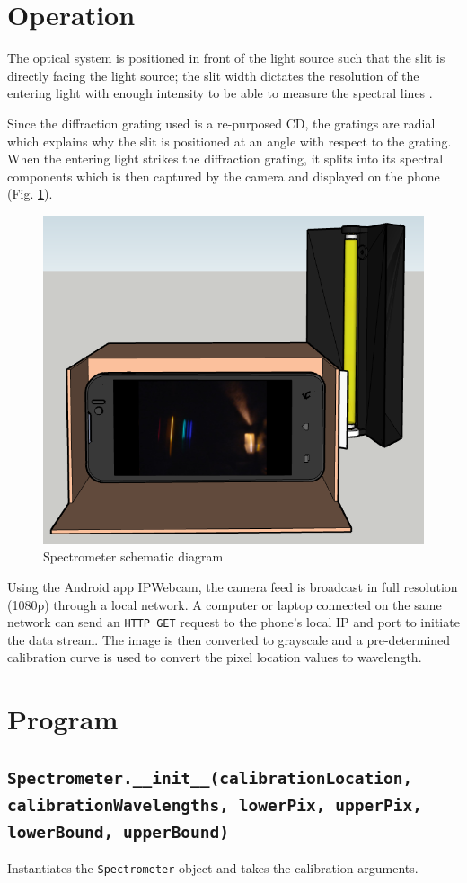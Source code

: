 \documentclass[12pt,a4paper,twoside]{article}
\begin{document}
\section{Operation}\label{sec:operation}\medskip
The optical system is positioned in front of the light source such that the slit is directly facing the light source; the slit width dictates the resolution of the entering light with enough intensity to be able to measure the spectral lines \cite{slit}. 

Since the diffraction grating used is a re-purposed CD, the gratings are radial which explains why the slit is positioned at an angle with respect to the grating. When the entering light strikes the diffraction grating, it splits into its spectral components which is then captured by the camera and displayed on the phone (Fig. \ref{setup}).

\begin{figure} [!h]
	\centering
	\includegraphics[width=0.6\linewidth]{setup1.PNG}
	\caption{\label{setup} Spectrometer schematic diagram}
\end{figure}

Using the Android app IPWebcam, the camera feed is broadcast in full resolution (1080p) through a local network. A computer or laptop connected on the same network can send an \texttt{HTTP GET} request to the phone's local IP and port to initiate the data stream. The image is then converted to grayscale and a pre-determined calibration curve is used to convert the pixel location values to wavelength.

\section{Program}\label{sec:program}\medskip

\subsection{\texttt{\footnotesize{Spectrometer}\normalsize{.\_\_init\_\_(calibrationLocation, calibrationWavelengths, lowerPix, upperPix, lowerBound, upperBound)}}}
Instantiates the \texttt{Spectrometer} object and takes the calibration arguments.
\end{document}
